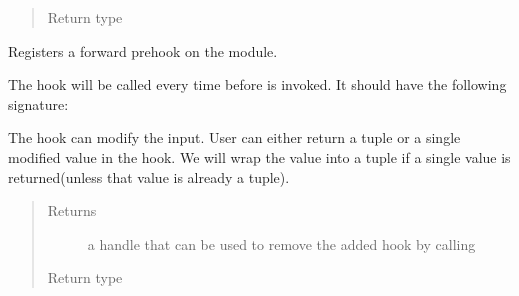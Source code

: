 \documentclass[letterpaper,10pt,english]{sphinxmanual}
\begin{document}
\begin{fulllineitems}
\begin{fulllineitems}
\begin{quote}
\begin{description}
\item[{Return type}] \leavevmode
{}

\end{description}\end{quote}

\end{fulllineitems}


\begin{fulllineitems}
\label{\detokenize{api/dynamics:geology.metamodelling.dynamics.NeuralDifferentialEquation.register_forward_pre_hook}}
Registers a forward pre\sphinxhyphen{}hook on the module.

The hook will be called every time before {\hyperref[\detokenize{api/dynamics:geology.metamodelling.dynamics.NeuralDifferentialEquation.forward}]{}} is invoked.
It should have the following signature:

\begin{sphinxVerbatim}[commandchars=\\\{\}]
      
\end{sphinxVerbatim}

The hook can modify the input. User can either return a tuple or a
single modified value in the hook. We will wrap the value into a tuple
if a single value is returned(unless that value is already a tuple).
\begin{quote}\begin{description}
\item[{Returns}] \leavevmode
a handle that can be used to remove the added hook by calling

\item[{Return type}] \leavevmode
{}

\end{description}\end{quote}

\end{fulllineitems}


\end{fulllineitems}
\end{document}

